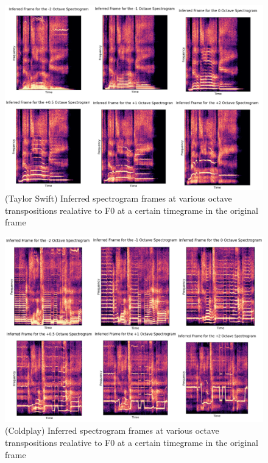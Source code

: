\begin{figure}[!ht]
    \centering
    \includegraphics[width=\textwidth]{research/results/TaylorSwift/InferredTranspositions.png}
    \caption{(Taylor Swift) Inferred spectrogram frames at various octave transpositions realative to F0 at a certain timegrame in the original frame}
\end{figure}

\begin{figure}[!ht]
    \centering
    \includegraphics[width=\textwidth]{research/results/Coldplay/InferredTranspositions.png}
    \caption{(Coldplay) Inferred spectrogram frames at various octave transpositions realative to F0 at a certain timegrame in the original frame}
\end{figure}



